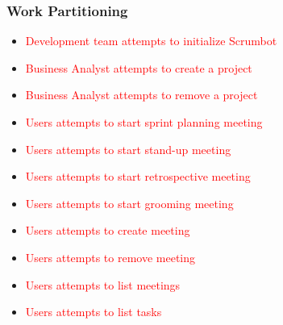 \documentclass[12pt, titlepage]{article}
\begin{document}
\subsubsection{Work Partitioning}
\begin{itemize}
    \item \textcolor{red}{Development team attempts to initialize Scrumbot}
    \item \textcolor{red}{Business Analyst attempts to create a project}
    \item \textcolor{red}{Business Analyst attempts to remove a project}
    \item \textcolor{red}{Users attempts to start sprint planning meeting}
    \item \textcolor{red}{Users attempts to start stand-up meeting}
    \item \textcolor{red}{Users attempts to start retrospective meeting}
    \item \textcolor{red}{Users attempts to start grooming meeting}
    \item \textcolor{red}{Users attempts to create meeting}
    \item \textcolor{red}{Users attempts to remove meeting}
    \item \textcolor{red}{Users attempts to list meetings}
    \item \textcolor{red}{Users attempts to list tasks}
\end{itemize}
\end{document}
